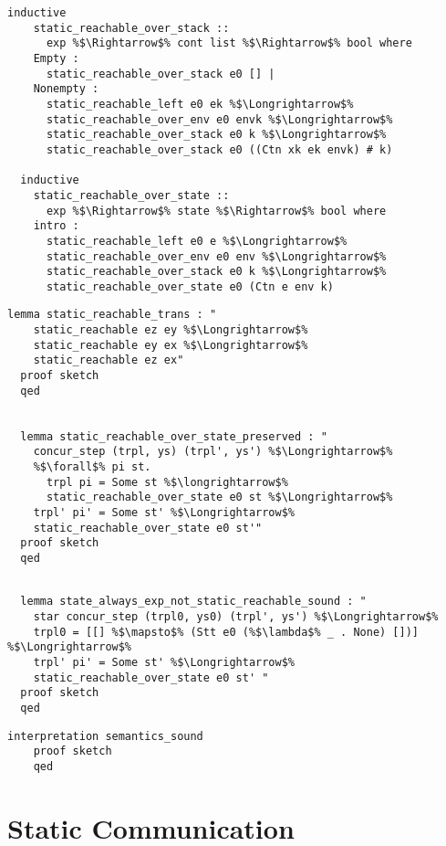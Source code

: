 \documentclass{article}
\begin{document}
\begin{lstlisting}[style=codestyle1, escapechar=\%]
  inductive
    static_reachable_over_stack ::
      exp %$\Rightarrow$% cont list %$\Rightarrow$% bool where
    Empty :
      static_reachable_over_stack e0 [] |
    Nonempty :
      static_reachable_left e0 ek %$\Longrightarrow$%
      static_reachable_over_env e0 envk %$\Longrightarrow$%
      static_reachable_over_stack e0 k %$\Longrightarrow$%
      static_reachable_over_stack e0 ((Ctn xk ek envk) # k)

  inductive
    static_reachable_over_state ::
      exp %$\Rightarrow$% state %$\Rightarrow$% bool where
    intro :
      static_reachable_left e0 e %$\Longrightarrow$%
      static_reachable_over_env e0 env %$\Longrightarrow$%
      static_reachable_over_stack e0 k %$\Longrightarrow$%
      static_reachable_over_state e0 (Ctn e env k)

  \end{lstlisting}

\begin{lstlisting}[style=codestyle1, escapechar=\%]
  lemma static_reachable_trans : "
    static_reachable ez ey %$\Longrightarrow$%
    static_reachable ey ex %$\Longrightarrow$%
    static_reachable ez ex"
  proof sketch 
  qed


  lemma static_reachable_over_state_preserved : "
    concur_step (trpl, ys) (trpl', ys') %$\Longrightarrow$%
    %$\forall$% pi st.
      trpl pi = Some st %$\longrightarrow$%
      static_reachable_over_state e0 st %$\Longrightarrow$%
    trpl' pi' = Some st' %$\Longrightarrow$%
    static_reachable_over_state e0 st'"
  proof sketch 
  qed
  \end{lstlisting}


\begin{lstlisting}[style=codestyle1, escapechar=\%]

  lemma state_always_exp_not_static_reachable_sound : "
    star concur_step (trpl0, ys0) (trpl', ys') %$\Longrightarrow$%
    trpl0 = [[] %$\mapsto$% (Stt e0 (%$\lambda$% _ . None) [])] %$\Longrightarrow$%
    trpl' pi' = Some st' %$\Longrightarrow$%
    static_reachable_over_state e0 st' "
  proof sketch
  qed

  \end{lstlisting}

\begin{lstlisting}[style=codestyle1, escapechar=\%]
    interpretation semantics_sound
    proof sketch
    qed
  \end{lstlisting}

\section{Static Communication}
\end{document}

